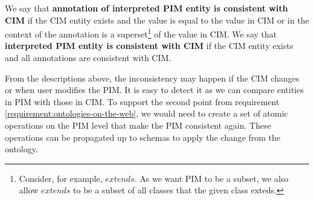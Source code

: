 




\begin{definition}[consistency]
    We say that \textbf{annotation of interpreted PIM entity is consistent with CIM} if the CIM entity exists and the value is equal to the value in CIM or in the context of the annotation is a superset\footnote{Consider, for example, $extends$. As we want PIM to be a subset, we also allow $extends$ to be a subset of all classes that the given class exteds.} of the value in CIM. We say that \textbf{interpreted PIM entity is consistent with CIM} if the CIM entity exists and all annotations are consistent with CIM.
\end{definition}

From the descriptions above, the inconsistency may happen if the CIM changes or when user modifies the PIM. It is easy to detect it as we can compare entities in PIM with those in CIM. To support the second point from requirement \ref{requirement:ontologies-on-the-web}, we would need to create a set of atomic operations on the PIM level that make the PIM consistent again. These operations can be propagated up to schemas to apply the change from the ontology.

